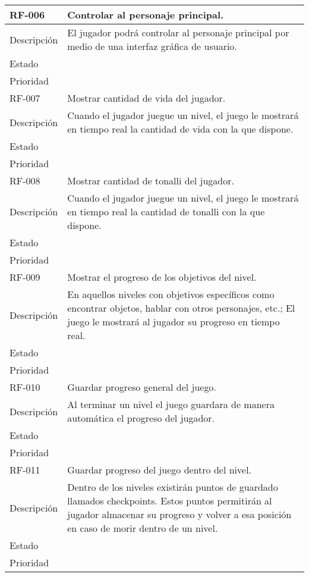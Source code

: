 \begin{longtable}[c]{ | m{5cm} | m{10cm}|}
		\hline
		\rowcolor{cyan}RF-006\label{RF:06} & Controlar al personaje principal. \\ 
		\hline
		Descripción	& El jugador podrá controlar al personaje principal por medio de una interfaz gráfica de usuario. \\ 
		\hline
		Estado &  \\ 
		\hline
		Prioridad &  \\
		\hline
		\rowcolor{cyan}RF-007\label{RF:07} & Mostrar cantidad de vida del jugador.\\ 
		\hline
		Descripción	& Cuando el jugador juegue un nivel, el juego le mostrará en tiempo real la cantidad de vida con la que dispone.  \\ 
		\hline
		Estado &  \\ 
		\hline
		Prioridad &  \\
		\hline
		\rowcolor{cyan}RF-008\label{RF:08} & Mostrar cantidad de tonalli del jugador.\\ 
		\hline
		Descripción	& Cuando el jugador juegue un nivel, el juego le mostrará en tiempo real la cantidad de tonalli con la que dispone.  \\ 
		\hline
		Estado &  \\ 
		\hline
		Prioridad &  \\
		\hline
		\rowcolor{cyan}RF-009\label{RF:09} & Mostrar el progreso de los objetivos del nivel.\\ 
		\hline
		Descripción	& En aquellos niveles con objetivos específicos como encontrar objetos, hablar con otros personajes, etc.; El juego le mostrará al jugador su progreso en tiempo real. \\ 
		\hline
		Estado &  \\ 
		\hline
		Prioridad &  \\
		\hline
		\rowcolor{cyan}RF-010\label{RF:10} & Guardar progreso general del juego.\\ 
		\hline
		Descripción	& Al terminar un nivel el juego guardara de manera automática el progreso del jugador. \\ 
		\hline
		Estado &  \\ 
		\hline
		Prioridad &  \\
		\hline
		\rowcolor{cyan}RF-011\label{RF:11} & Guardar progreso del juego dentro del nivel.\\ 
		\hline
		Descripción	& Dentro de los niveles existirán puntos de guardado llamados checkpoints. Estos puntos permitirán al jugador almacenar su progreso y volver a esa posición en caso de morir dentro de un nivel.\\ 
		\hline
		Estado &  \\ 
		\hline
		Prioridad &  \\
		\hline
	\end{longtable}
